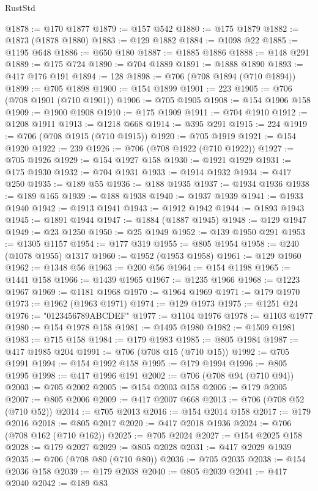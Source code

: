 \begin{lexlean}{RustStd}
\begin{coremodule}
@1878 := @170 @1877
@1879 := @157 @542
@1880 := @175 @1879
@1882 := @1873 (@1878 @1880)
@1883 := @129 @1882
@1884 := @1098 @22
@1885 := @1195 @648
@1886 := @650 @180
@1887 := @1885 @1886
@1888 := @148 @291
@1889 := @175 @724
@1890 := @704 @1889
@1891 := @1888 @1890
@1893 := @417 @176 @191
@1894 := 128
@1898 := @706 (@708 @1894 (@710 @1894))
@1899 := @705 @1898
@1900 := @154 @1899
@1901 := 223
@1905 := @706 (@708 @1901 (@710 @1901))
@1906 := @705 @1905
@1908 := @154 @1906 @158
@1909 := @1900 @1908
@1910 := @175 @1909
@1911 := @704 @1910
@1912 := @1208 @1911
@1913 := @1218 @668
@1914 := @395 @291
@1915 := 224
@1919 := @706 (@708 @1915 (@710 @1915))
@1920 := @705 @1919
@1921 := @154 @1920
@1922 := 239
@1926 := @706 (@708 @1922 (@710 @1922))
@1927 := @705 @1926
@1929 := @154 @1927 @158
@1930 := @1921 @1929
@1931 := @175 @1930
@1932 := @704 @1931
@1933 := @1914 @1932
@1934 := @417 @250
@1935 := @189 @55
@1936 := @188 @1935
@1937 := @1934 @1936
@1938 := @189 @165
@1939 := @188 @1938
@1940 := @1937 @1939
@1941 := @1933 @1940
@1942 := @1913 @1941
@1943 := @1912 @1942
@1944 := @1893 @1943
@1945 := @1891 @1944
@1947 := @1884 (@1887 @1945)
@1948 := @129 @1947
@1949 := @23 @1250
@1950 := @25 @1949
@1952 := @139 @1950 @291
@1953 := @1305 @1157
@1954 := @177 @319
@1955 := @805 @1954
@1958 := @240 (@1078 @1955) @1317
@1960 := @1952 (@1953 @1958)
@1961 := @129 @1960
@1962 := @1348 @56
@1963 := @200 @56
@1964 := @154 @1198
@1965 := @1441 @158
@1966 := @1439 @1965
@1967 := @1235 @1966
@1968 := @1223 @1967
@1969 := @1181 @1968
@1970 := @1964 @1969
@1971 := @179 @1970
@1973 := @1962 (@1963 @1971)
@1974 := @129 @1973
@1975 := @1251 @24
@1976 := "0123456789ABCDEF"
@1977 := @1104 @1976
@1978 := @1103 @1977
@1980 := @154 @1978 @158
@1981 := @1495 @1980
@1982 := @1509 @1981
@1983 := @715 @158
@1984 := @179 @1983
@1985 := @805 @1984
@1987 := @417 @1985 @204
@1991 := @706 (@708 @15 (@710 @15))
@1992 := @705 @1991
@1994 := @154 @1992 @158
@1995 := @179 @1994
@1996 := @805 @1995
@1998 := @417 @1996 @191
@2002 := @706 (@708 @94 (@710 @94))
@2003 := @705 @2002
@2005 := @154 @2003 @158
@2006 := @179 @2005
@2007 := @805 @2006
@2009 := @417 @2007 @668
@2013 := @706 (@708 @52 (@710 @52))
@2014 := @705 @2013
@2016 := @154 @2014 @158
@2017 := @179 @2016
@2018 := @805 @2017
@2020 := @417 @2018 @1936
@2024 := @706 (@708 @162 (@710 @162))
@2025 := @705 @2024
@2027 := @154 @2025 @158
@2028 := @179 @2027
@2029 := @805 @2028
@2031 := @417 @2029 @1939
@2035 := @706 (@708 @80 (@710 @80))
@2036 := @705 @2035
@2038 := @154 @2036 @158
@2039 := @179 @2038
@2040 := @805 @2039
@2041 := @417 @2040
@2042 := @189 @83

\end{coremodule}
\end{lexlean}
